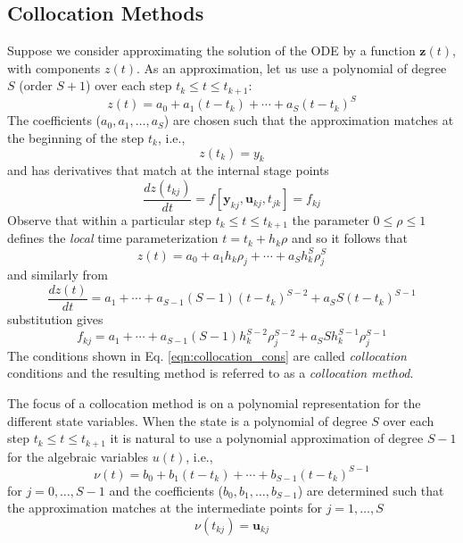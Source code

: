 \documentclass[]{article}
\begin{document}
\subsection{Collocation Methods}
Suppose we consider approximating the solution of the ODE by a function $\mathbf{z}(t)$, with components $z(t)$. As an approximation, let us use a polynomial of degree $S$ (order $S+1$) over each step $t_k \leq t \leq t_{k+1}$:
\begin{equation}
    z(t) = a_0 + a_1 (t - t_k) + \cdots + a_S (t - t_k)^S
\end{equation}
The coefficients ($a_0,a_1,\dots,a_S$) are chosen such that the approximation matches at the beginning of the step $t_k$, i.e., 
\begin{equation}
    z(t_k) = y_k
\end{equation}
and has derivatives that match at the internal stage points
\begin{equation}
    \frac{dz(t_{kj})}{dt} = f\left[\mathbf{y}_{kj},\mathbf{u}_{kj},t_{jk}\right] = f_{kj}
    \label{eqn:collocation_cons}
\end{equation}
Observe that within a particular step $t_k \leq t \leq t_{k+1}$ the parameter $0 \leq \rho \leq 1$ defines the \textit{local} time parameterization $t = t_k + h_k\rho$ and so it follows that 
\begin{equation}
    z(t) = a_0 + a_1 h_k \rho_j + \cdots + a_S h_k^S\rho_j^S
\end{equation}
and similarly from
\begin{equation}
    \frac{dz(t)}{dt} = a_1 + \cdots + a_{S-1}(S-1)(t - t_k)^{S-2} + a_SS(t - t_k)^{S-1}
\end{equation}
substitution gives
\begin{equation}
    f_{kj} = a_1 + \cdots + a_{S-1}(S-1)h_k^{S-2}\rho_j^{S-2}+a_SSh_k^{S-1}\rho_j^{S-1}
\end{equation}
The conditions shown in Eq. \eqref{eqn:collocation_cons} are called \textit{collocation} conditions and the resulting method is referred to as a \textit{collocation method}.

\noindent The focus of a collocation method is on a polynomial representation for the different state variables. When the state is a polynomial of degree $S$ over each step $t_k \leq t \leq t_{k+1}$ it is natural to use a polynomial approximation of degree $S-1$ for the algebraic variables $u(t)$, i.e., 
\begin{equation}
    \nu(t) = b_0 + b_1(t - t_k) + \cdots + b_{S-1}(t - t_k)^{S-1}
\end{equation}
for $j=0,\dots,S-1$ and the coefficients ($b_0,b_1,\dots,b_{S-1}$) are determined such that the approximation matches at the intermediate points for $j=1,\dots,S$
\begin{equation}
    \nu(t_{kj}) = \mathbf{u}_{kj}
\end{equation}
\end{document}
